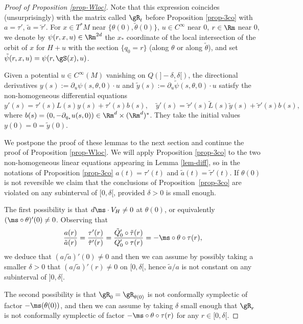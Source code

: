 \begin{proof}[Proof of Proposition \ref{prop-Wloc}]
Note that this expression coincides (unsurprisingly) with the matrix called $\gR_t$ before Proposition \ref{prop-3co}
with $a =\tau'$, $\tilde a =\tilde \tau '$.
For $x\in T^*M$ near $\{\theta(0),\tilde \theta(0)\}$, $u\in C^{\infty}$ near $0$, $r\in \Rm$ near $0$, we denote by $\psi(r,x,u)\in \Rm^{2d}$ the $x_*$ coordinate of the local intersection
of the orbit of $x$ for $H+u$ with the section $\{q_0=r\}$ (along $\theta$ or along $\tilde \theta$), and set
$\tilde \psi(r,x,u)=\psi(r,\gS(x),u)$.

\begin{lem}\label{lem-diff} Given a potential $u\in C^{\infty}(M)$ vanishing on $Q(]-\delta, \delta[)$, the directional derivatives
$y(s):= \partial_{u}\psi(s,\theta, 0)\cdot u$ and $\tilde y(s):= \partial_{u}\tilde \psi(s,\theta, 0)\cdot u$ satisfy the non-homogeneous differential equations
\[
y'(s)= \tau'(s)L(s)y(s)+\tau'(s)b(s), \quad
\tilde y'(s)= \tilde \tau '(s)\tilde L(s)\tilde y(s)+\tilde \tau'(s)b(s),
\]
where $b(s)= (0,-\partial_{q_*}u(s,0))\in \Rm^d \times (\Rm^d)^*$. They take the initial values $y(0)=0=\tilde y(0)$.
\end{lem}

We postpone the proof of these lemmas to the next section and continue the proof of Proposition \ref{prop-Wloc}.
We will apply Proposition \ref{prop-3co} to the two non-homogeneous linear equations appearing in Lemma \ref{lem-diff}, so
in the notations of Proposition \ref{prop-3co} $a(t)=\tau'(t)$ and $\tilde a (t)= \tilde \tau'(t)$.
If $\theta(0)$ is not reversible
we claim that the conclusions of Proposition~\ref{prop-3co} are violated on any subinterval of $[0, \delta[$, provided $\delta>0$
is small enough.

The first possibility is that $d\ms\cdot V_H\neq 0$ at $\theta(0)$,
or equivalently $(\ms\circ \theta)'(0)\neq 0$.
Observing that
\[
\frac{a(r)}{\tilde a(r)}= \frac{\tau' (r)}{\tilde \tau'(r)}=\frac{\tilde Q'_0 \circ \tilde\tau (r)}{Q'_0\circ \tau(r)}=
-\ms\circ \theta\circ \tau(r),
\]
we deduce that $(a/\tilde a)'(0)\neq 0$ and then we can assume by possibly taking a smaller $\delta>0$ that
$(a /\tilde a)'(r)\neq 0$
on $[0, \delta[$, hence $\tilde a/a$ is not constant on any subinterval of $]0, \delta[$.

The second possibility is that $\gR_0=\gR_{\theta(0)}$ is not conformally symplectic of factor $-\ms(\theta(0))$, and then we can assume by taking $\delta$ small enough
that $\gR_r$ is not conformally symplectic of factor $-\ms\circ \theta\circ \tau(r) $ for any $r\in [0,\delta[$.


\end{proof}

